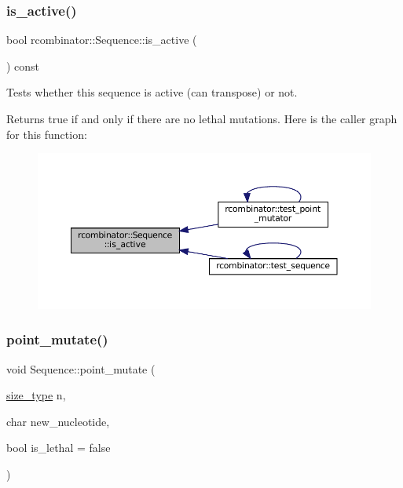 \subsubsection{\texorpdfstring{is\+\_\+active()}{is\_active()}}
{\footnotesize\ttfamily bool rcombinator\+::\+Sequence\+::is\+\_\+active (\begin{DoxyParamCaption}{ }\end{DoxyParamCaption}) const\hspace{0.3cm}{\ttfamily [inline]}}



Tests whether this sequence is active (can transpose) or not. 

Returns true if and only if there are no lethal mutations. Here is the caller graph for this function\+:
\nopagebreak
\begin{figure}[H]
\begin{center}
\leavevmode
\includegraphics[width=350pt]{classrcombinator_1_1Sequence_a5af66ddd3c8bc05307b56737c56060bf_icgraph}
\end{center}
\end{figure}
\mbox{\label{classrcombinator_1_1Sequence_a85299c3dbf2efb993a43acc2e42fcb00}} 
\subsubsection{\texorpdfstring{point\+\_\+mutate()}{point\_mutate()}}
{\footnotesize\ttfamily void Sequence\+::point\+\_\+mutate (\begin{DoxyParamCaption}\item[{\mbox{\hyperlink{constants_8h_abcd18a5521fc90ff6e7b00e4fee98397}{size\+\_\+type}}}]{n,  }\item[{char}]{new\+\_\+nucleotide,  }\item[{bool}]{is\+\_\+lethal = {\ttfamily false} }\end{DoxyParamCaption})}



